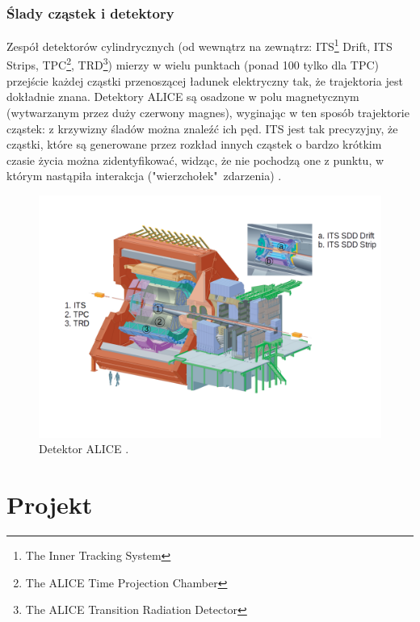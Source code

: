 \subsubsection{Ślady cząstek i detektory}
Zespół detektorów cylindrycznych (od wewnątrz na zewnątrz: ITS\footnote{The Inner Tracking System}  Drift, ITS Strips, TPC\footnote{The ALICE Time Projection Chamber}, TRD\footnote{The ALICE Transition Radiation Detector}) mierzy w wielu punktach (ponad 100 tylko dla TPC) przejście każdej cząstki przenoszącej ładunek elektryczny tak, że trajektoria jest dokładnie znana. Detektory ALICE są osadzone w polu magnetycznym (wytwarzanym przez duży czerwony magnes), wyginając w ten sposób trajektorie cząstek: z krzywizny śladów można znaleźć ich pęd. ITS jest tak precyzyjny, że cząstki, które są generowane przez rozkład innych cząstek o bardzo krótkim czasie życia można zidentyfikować, widząc, że nie pochodzą one z punktu, w którym nastąpiła interakcja ("wierzchołek"\ zdarzenia) \cite{trackingparticles}.

\begin{figure}[H]
		\centering
 		\includegraphics[width=16.0cm]{detector.png}
    	\caption{Detektor ALICE \cite{aliceofficial}.}
 		\label{rys9}
\end{figure}
\newpage
\section{Projekt}
